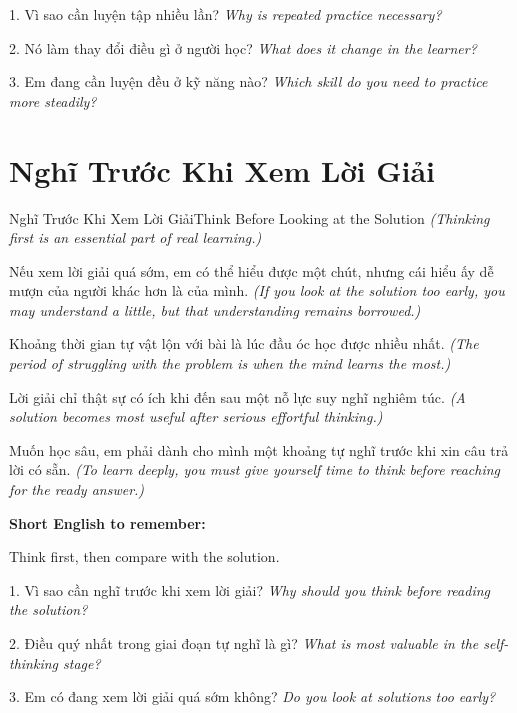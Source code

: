 \begin{tuhocnhanh}
1. Vì sao cần luyện tập nhiều lần? \textit{Why is repeated practice necessary?}

2. Nó làm thay đổi điều gì ở người học? \textit{What does it change in the learner?}

3. Em đang cần luyện đều ở kỹ năng nào? \textit{Which skill do you need to practice more steadily?}
\end{tuhocnhanh}
\ngancach

\section{Nghĩ Trước Khi Xem Lời Giải}
\begin{truyen}{Nghĩ Trước Khi Xem Lời Giải}{Think Before Looking at the Solution}
\textit{(Thinking first is an essential part of real learning.)}

Nếu xem lời giải quá sớm, em có thể hiểu được một chút, nhưng cái hiểu ấy dễ mượn của người khác hơn là của mình.
\textit{(If you look at the solution too early, you may understand a little, but that understanding remains borrowed.)}

Khoảng thời gian tự vật lộn với bài là lúc đầu óc học được nhiều nhất.
\textit{(The period of struggling with the problem is when the mind learns the most.)}

Lời giải chỉ thật sự có ích khi đến sau một nỗ lực suy nghĩ nghiêm túc.
\textit{(A solution becomes most useful after serious effortful thinking.)}
\end{truyen}

\begin{baihoc}
Muốn học sâu, em phải dành cho mình một khoảng tự nghĩ trước khi xin câu trả lời có sẵn.
\textit{(To learn deeply, you must give yourself time to think before reaching for the ready answer.)}
\end{baihoc}

\begin{ghinhoanh}
\textbf{Short English to remember:}

Think first, then compare with the solution.

\end{ghinhoanh}

\begin{tuhocnhanh}
1. Vì sao cần nghĩ trước khi xem lời giải? \textit{Why should you think before reading the solution?}

2. Điều quý nhất trong giai đoạn tự nghĩ là gì? \textit{What is most valuable in the self-thinking stage?}

3. Em có đang xem lời giải quá sớm không? \textit{Do you look at solutions too early?}
\end{tuhocnhanh}
\ngancach

